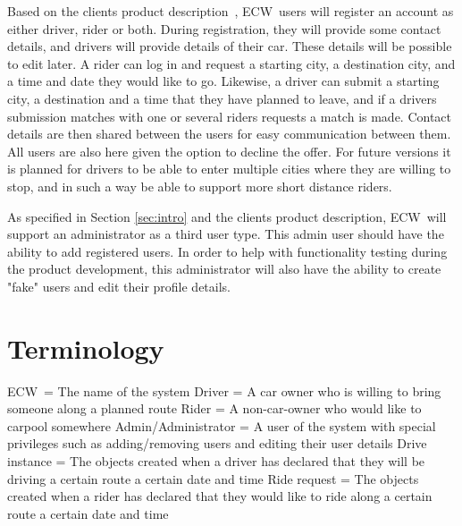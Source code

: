 \documentclass{article}
\newcommand{\name}{ECW\ }
\begin{document}
Based on the clients product description~\cite{PH}, \name users will register an account as either driver, rider or both. During registration, they will provide some contact details, and drivers will provide details of their car. These details will be possible to edit later. A rider can log in and request a starting city, a destination city, and a time and date they would like to go. Likewise, a driver can submit a starting city, a destination and a time that they have planned to leave, and if a drivers submission matches with one or several riders requests a match is made. Contact details are then shared between the users for easy communication between them. All users are also here given the option to decline the offer. For future versions it is planned for drivers to be able to enter multiple cities where they are willing to stop, and in such a way be able to support more short distance riders.

As specified in Section \ref{sec:intro} and the clients product description\cite{PH}, \name will support an administrator as a third user type. This admin user should have the ability to add registered users. In order to help with functionality testing during the product development, this administrator will also have the ability to create "fake" users and edit their profile details.

\section{Terminology}
\name = The name of the system\newline
Driver = A car owner who is willing to bring someone along a planned route\newline
Rider = A non-car-owner who would like to carpool somewhere\newline
Admin/Administrator = A user of the system with special privileges such as adding/removing users and editing their user details
Drive instance = The objects created when a driver has declared that they will be driving a certain route a certain date and time
Ride request = The objects created when a rider has declared that they would like to ride along a certain route a certain date and time

\newpage
\end{document}
